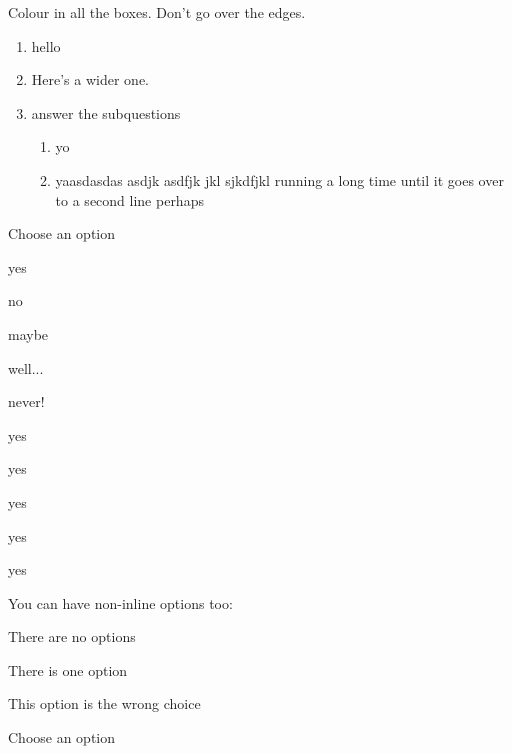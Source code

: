 \documentclass{ouicma}
\begin{document}
\maketitle


\question
Colour in all the boxes. Don't go over the edges.

\begin{enumerate}
\item hello \bigskip\answerbox
\item Here's a wider one.\bigskip \wideanswerbox
\item answer the subquestions
\begin{enumerate}
\item yo\medskip \answerbox 
\item yaasdasdas asdjk asdfjk jkl sjkdfjkl  running a long time until it goes over to a second line perhaps\wideanswerbox
\end{enumerate}
\end{enumerate}


\question

Choose an option

\begin{inlineoptions}{5}%
\item yes
\item no
\item maybe
\item well...
\item never!
\item yes
\item yes
\item yes
\item yes
\item yes\answerbox
\end{inlineoptions}

\question
You can have non-inline options too:
\begin{options}
\item There are no options
\item There is one option
\item This option is the wrong choice\answerbox
\end{options}

\question

Choose an option
\end{document}
